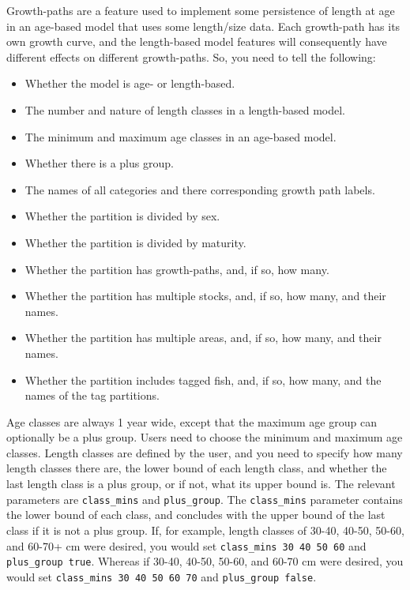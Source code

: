 Growth-paths are a feature used to implement some persistence of length at age in an age-based model that uses some length/size data. Each growth-path has its own growth curve, and the length-based model features will consequently  have different effects on different growth-paths. So, you need to tell \cas  the following: 

\begin{itemize}
\item Whether the model is age- or length-based.
\item The number and nature of length classes in a length-based model.
\item	The minimum and maximum age classes in an age-based model.
\item	Whether there is a plus group.
\item 	The names of all categories and there corresponding growth path labels.
\item	Whether the partition is divided by sex.
\item	Whether the partition is divided by maturity.
\item	Whether the partition has growth-paths, and, if so, how many.
\item	Whether the partition has multiple stocks, and, if so, how many, and their names.
\item	Whether the partition has multiple areas, and, if so, how many, and their names.
\item	Whether the partition includes tagged fish, and, if so, how many, and the names of the tag partitions.
\end{itemize}

Age classes are always 1 year wide, except that the maximum age group can optionally be a plus group. Users need to choose the minimum and maximum age classes. Length classes are defined by the user, and you need to specify how many length classes there are, the lower bound of each length class, and whether the last length class is a plus group, or if not, what its upper bound is. The relevant parameters are \texttt{class\_mins} and \texttt{plus\_group}. The \texttt{class\_mins} parameter contains the lower bound of each class, and concludes with the upper bound of the last class if it is not a plus group. If, for example, length classes of 30-40, 40-50, 50-60, and 60-70+ cm were desired, you would set \texttt{class\_mins 30 40 50 60} and \texttt{plus\_group true}. Whereas if 30-40, 40-50, 50-60, and 60-70 cm were desired, you would set \texttt{class\_mins 30 40 50 60 70} and \texttt{plus\_group false}.

